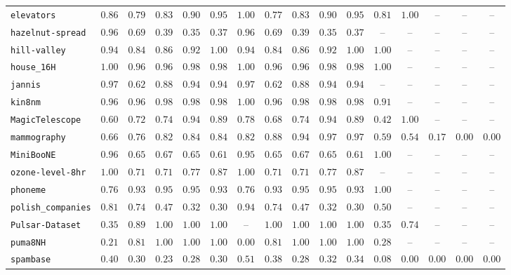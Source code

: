 {\begin{tabular}{@{}lccccccccccccccc@{}}
\texttt{elevators} & $0.86$ & $0.79$ & $0.83$ & $0.90$ & $0.95$ & $1.00$ & $0.77$ & $0.83$ & $0.90$ & $0.95$ & $0.81$ & $1.00$ & -- & -- & -- \\
\texttt{hazelnut-spread} & $0.96$ & $0.69$ & $0.39$ & $0.35$ & $0.37$ & $0.96$ & $0.69$ & $0.39$ & $0.35$ & $0.37$ & -- & -- & -- & -- & -- \\
\texttt{hill-valley} & $0.94$ & $0.84$ & $0.86$ & $0.92$ & $1.00$ & $0.94$ & $0.84$ & $0.86$ & $0.92$ & $1.00$ & $1.00$ & -- & -- & -- & -- \\
\texttt{house\_16H} & $1.00$ & $0.96$ & $0.96$ & $0.98$ & $0.98$ & $1.00$ & $0.96$ & $0.96$ & $0.98$ & $0.98$ & $1.00$ & -- & -- & -- & -- \\
\texttt{jannis} & $0.97$ & $0.62$ & $0.88$ & $0.94$ & $0.94$ & $0.97$ & $0.62$ & $0.88$ & $0.94$ & $0.94$ & -- & -- & -- & -- & -- \\
\texttt{kin8nm} & $0.96$ & $0.96$ & $0.98$ & $0.98$ & $0.98$ & $1.00$ & $0.96$ & $0.98$ & $0.98$ & $0.98$ & $0.91$ & -- & -- & -- & -- \\
\texttt{MagicTelescope} & $0.60$ & $0.72$ & $0.74$ & $0.94$ & $0.89$ & $0.78$ & $0.68$ & $0.74$ & $0.94$ & $0.89$ & $0.42$ & $1.00$ & -- & -- & -- \\
\texttt{mammography} & $0.66$ & $0.76$ & $0.82$ & $0.84$ & $0.84$ & $0.82$ & $0.88$ & $0.94$ & $0.97$ & $0.97$ & $0.59$ & $0.54$ & $0.17$ & $0.00$ & $0.00$ \\
\texttt{MiniBooNE} & $0.96$ & $0.65$ & $0.67$ & $0.65$ & $0.61$ & $0.95$ & $0.65$ & $0.67$ & $0.65$ & $0.61$ & $1.00$ & -- & -- & -- & -- \\
\texttt{ozone-level-8hr} & $1.00$ & $0.71$ & $0.71$ & $0.77$ & $0.87$ & $1.00$ & $0.71$ & $0.71$ & $0.77$ & $0.87$ & -- & -- & -- & -- & -- \\
\texttt{phoneme} & $0.76$ & $0.93$ & $0.95$ & $0.95$ & $0.93$ & $0.76$ & $0.93$ & $0.95$ & $0.95$ & $0.93$ & $1.00$ & -- & -- & -- & -- \\
\texttt{polish\_companies} & $0.81$ & $0.74$ & $0.47$ & $0.32$ & $0.30$ & $0.94$ & $0.74$ & $0.47$ & $0.32$ & $0.30$ & $0.50$ & -- & -- & -- & -- \\
\texttt{Pulsar-Dataset} & $0.35$ & $0.89$ & $1.00$ & $1.00$ & $1.00$ & -- & $1.00$ & $1.00$ & $1.00$ & $1.00$ & $0.35$ & $0.74$ & -- & -- & -- \\
\texttt{puma8NH} & $0.21$ & $0.81$ & $1.00$ & $1.00$ & $1.00$ & $0.00$ & $0.81$ & $1.00$ & $1.00$ & $1.00$ & $0.28$ & -- & -- & -- & -- \\
\texttt{spambase} & $0.40$ & $0.30$ & $0.23$ & $0.28$ & $0.30$ & $0.51$ & $0.38$ & $0.28$ & $0.32$ & $0.34$ & $0.08$ & $0.00$ & $0.00$ & $0.00$ & $0.00$ \\

\end{tabular}}
